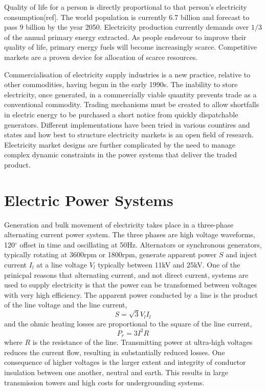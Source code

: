 Quality of life for a person is directly proportional to that person's
electricity consumption[ref].  The world population is currently 6.7 billion
and forecast to pass 9 billion by the year 2050.  Electricity production
currently demands over $1/3$ of the annual primary energy extracted.  As people
endevour to improve their quality of life, primary energy fuels will become
increasingly scarce.  Competitive markets are a proven device for allocation
of scarce resources.

Commercialisation of electricity supply industries is a new practice, relative
to other commodities, having begun in the early 1990s.  The inability to store
electricity, once generated, in a commercially viable quantity prevents trade
as a conventional commodity.  Trading mechanisms must be created to allow
shortfalls in electric energy to be purchased a short notice from quickly
dispatchable generators.  Different implementations have been tried in various
countires and states and how best to structure electricity markets is an open
field of research.  Electricity market designs are further complicated by the
need to manage complex dynamic constraints in the power systems that deliver
the traded product.

\section{Electric Power Systems}
Generation and bulk movement of electricity takes place in a three-phase
alternating current power system.  The three phases are high voltage waveforms,
120$^\circ$ offset in time and oscillating at 50Hz.  Alternators or synchronous
generators, typically rotating at 3600rpm or 1800rpm, generate apparent power
$S$ and inject current $I_l$ at a line voltage $V_l$ typically between 11kV and
25kV.  One of the prinicpal reasons that alternating current, and not direct
current, systems are used to supply electricity is that the power can be
transformed between voltages with very high efficiency.  The apparent power
conducted by a line is the product of the line voltage and the line current,
\begin{equation}
S = \sqrt{3} V_l I_l
\end{equation}
and the ohmic heating losses are proportional to the square of the line
current,
\begin{equation}
P_{r} = 3 I^2 R
\end{equation}
where $R$ is the resistance of the line.  Transmitting power at ultra-high
voltages reduces the current flow, resulting in substantially reduced losses.
One consequence of higher voltages is the larger extent and integrity
of conductor insulation between one another, neutral and earth.  This results
in large transmission towers and high costs for undergrounding systems.

